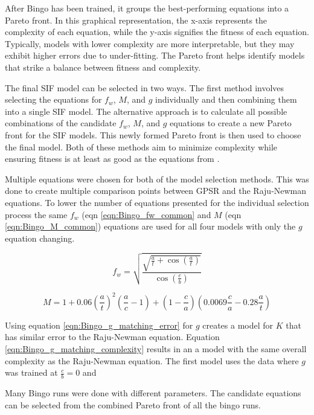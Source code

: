 
After Bingo has been trained, it groups the best-performing equations into a Pareto front. In this graphical representation, the x-axis represents the complexity of each equation, while the y-axis signifies the fitness of each equation. Typically, models with lower complexity are more interpretable, but they may exhibit higher errors due to under-fitting. The Pareto front helps identify models that strike a balance between fitness and complexity.

The final SIF model can be selected in two ways. The first method involves selecting the equations for $f_w$, $M$, and $g$ individually and then combining them into a single SIF model. The alternative approach is to calculate all possible combinations of the candidate $f_w$, $M$, and $g$ equations to create a new Pareto front for the SIF models. This newly formed Pareto front is then used to choose the final model. Both of these methods aim to minimize complexity while ensuring fitness is at least as good as the equations from \cite{RNeqnsbook}.


Multiple equations were chosen for both of the model selection methods. This was done to create multiple comparison points between GPSR and the Raju-Newman equations. To lower the number of equations presented for the individual selection process the same $f_w$ (eqn \ref{eqn:Bingo_fw_common} and $M$ (eqn \ref{eqn:Bingo_M_common}) equations are used for all four models with only the $g$ equation changing.  

\begin{equation} \label{eqn:Bingo_fw_common}
    f_w = \sqrt{\frac{\sqrt{\frac{a}{t} + \cos\left(\frac{a}{t}\right)}}{\cos\left(\frac{c}{b}\right)}}
\end{equation}

\begin{equation} \label{eqn:Bingo_M_common}
    M = 1 + 0.06\left(\frac{a}{t}\right)^2\left(\frac{a}{c} - 1 \right) + \left(1 - \frac{c}{a} \right) \left(0.0069 \frac{c}{a} - 0.28 \frac{a}{t} \right)
\end{equation}


Using equation \ref{eqn:Bingo_g_matching_error} for $g$ creates a model for $K$ that has similar error to the Raju-Newman equation. Equation \ref{eqn:Bingo_g_matching_complexity} results in an a model with the same overall complexity as the Raju-Newman equation. 
The first model uses the data where $g$ was trained at $\frac{c}{b} = 0$ and 

Many Bingo runs were done with different parameters. The candidate equations can be selected from the combined Pareto front of all the bingo runs. 

